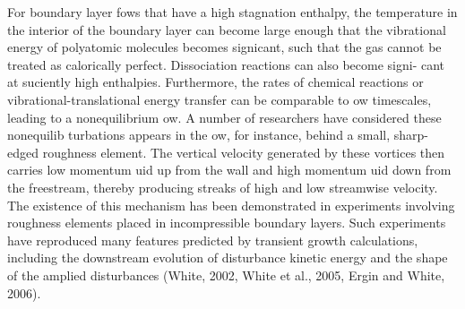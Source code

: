 For boundary layer fows that have a high stagnation enthalpy, the temperature
in the interior of the boundary layer can become large enough that the vibrational
energy of polyatomic molecules becomes signicant, such that the gas cannot
be treated as calorically perfect. Dissociation reactions can also become signi-
cant at suciently high enthalpies. Furthermore, the rates of chemical reactions or
vibrational-translational energy transfer can be comparable to 
ow timescales, leading to a nonequilibrium ow. A number of researchers have considered these nonequilib turbations appears in the 
ow, for instance, behind a small, sharp-edged roughness
element. The vertical velocity generated by these vortices then carries low momentum uid up from the wall and high momentum 
uid down from the freestream, thereby producing streaks of high and low streamwise velocity. The existence of this mechanism
has been demonstrated in experiments involving roughness elements placed in
incompressible boundary layers. Such experiments have reproduced many features
predicted by transient growth calculations, including the downstream evolution of
disturbance kinetic energy and the shape of the amplied disturbances (White, 2002,
White et al., 2005, Ergin and White, 2006).






